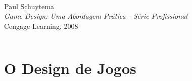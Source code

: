 \expandafter\documentclass\expandafter[table, usenames, svgnames, dvipsnames, \classopts]{beamer}
\begin{document}
\begin{frame}
\begin{columns}[c]
			\begin{center}
				\\
				Paul Schuytema\\[0.5em]
				\textit{{\large Game Design: Uma Abordagem Prática - Série Profissional}}\\[0.5em]
				{\small Cengage Learning, 2008}
			\end{center}
			
	\end{columns}
	
\end{frame}

	
	

\section{O Design de Jogos}
\end{document}
